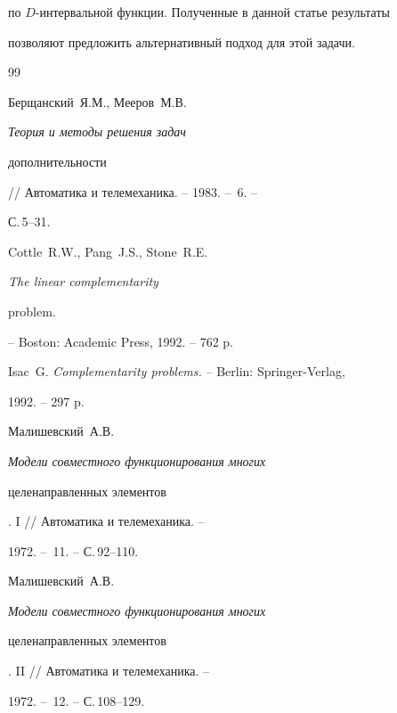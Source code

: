 по $D$-интервальной функции. Полученные в данной статье результаты


позволяют предложить альтернативный подход для этой задачи.











\begin{thebibliography}{99}







Берщанский~Я.М., Мееров~М.В. {\it Теория и методы решения задач


дополнительности} // Автоматика и телемеханика. -- 1983. -- \No\,6. --


С.\,5--31.







Cottle~R.W., Pang~J.S., Stone~R.E. {\it The linear complementarity


problem.} -- Boston: Academic Press, 1992. -- 762 p.







Isac~G. {\it Complementarity problems.} -- Berlin: Springer-Verlag,


1992. -- 297 p.







Малишевский~А.В. {\it Модели совместного функционирования многих


целенаправленных элементов}. I  // Автоматика и телемеханика. --


1972. -- \No\,11. -- С.\,92--110.







Малишевский~А.В. {\it Модели совместного функционирования многих


целенаправленных элементов}. II // Автоматика и телемеханика. --


1972. -- \No\,12. -- С.\,108--129.








\end{thebibliography}
